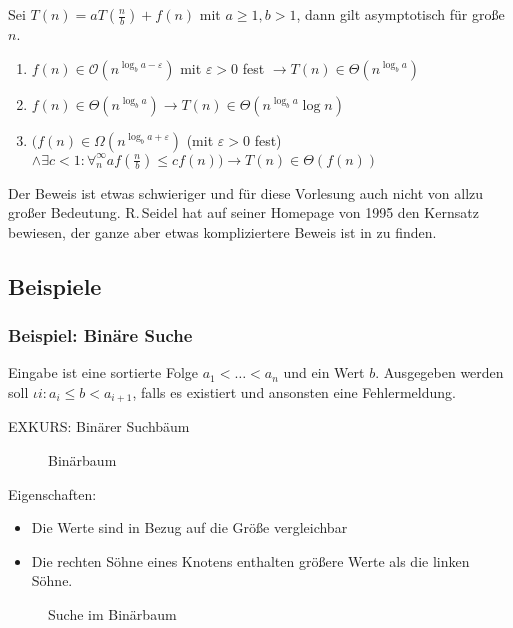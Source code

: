 \documentclass[ngerman,draft,parskip=half*,twoside]{scrreprt}
\theoremstyle{break}
\theoremstyle{nonumberbreak}
\newcommand*{\OO}{\mathcal{O}}      %
\begin{document}
Sei $T(n)=a T(\frac{n}{b})+f(n)$ mit $a \geq 1,b > 1$, 
dann gilt asymptotisch für große $n$.

\begin{enumerate}
\item $f(n) \in \OO(n^{\log_b a-\varepsilon})$ mit $\varepsilon > 0$ fest $\rightarrow T(n) \in\Theta(n^{\log_ba})$

\item $f(n) \in\Theta(n^{\log_ba}) \rightarrow T(n) \in\Theta(n^{\log_ba} \log n)$

\item $(f(n) \in\Omega(n^{\log_ba+\varepsilon} ) $ (mit $ \varepsilon > 0 $ fest)
$\wedge\exists c < 1 \colon  \forall^{\infty}_{n}
a f(\frac{n}{b})  \leq c f(n)) \rightarrow T(n) \in \Theta(f(n))$
\end{enumerate}

Der Beweis ist etwas schwieriger und für diese Vorlesung auch nicht
von allzu großer Bedeutung.
R.\,Seidel hat auf seiner Homepage
von 1995 den Kernsatz bewiesen, der ganze aber etwas kompliziertere Beweis ist in \cite{cormen} zu finden. 

\subsection{Beispiele}
\subsubsection{Beispiel: Binäre Suche} 

Eingabe ist eine sortierte Folge $a_1 < \dots < a_{n}$ und ein Wert
$b$. Ausgegeben werden soll $\iota i\colon a_{i} \leq b < a_{i+1}$,
falls es existiert und ansonsten eine Fehlermeldung.


EXKURS: Binärer Suchbäum
\begin{figure}[H]
	\centering
	\caption{Binärbaum}
	\label{271003a}
\end{figure}

Eigenschaften:
\begin{itemize}
	\item Die Werte sind in Bezug auf die Größe vergleichbar
	\item Die rechten Söhne eines Knotens enthalten größere Werte als die linken Söhne.
\end{itemize}

\begin{figure}
	\centering
	\caption{Suche im Binärbaum}
	\label{271003b}
\end{figure}
\end{document}
